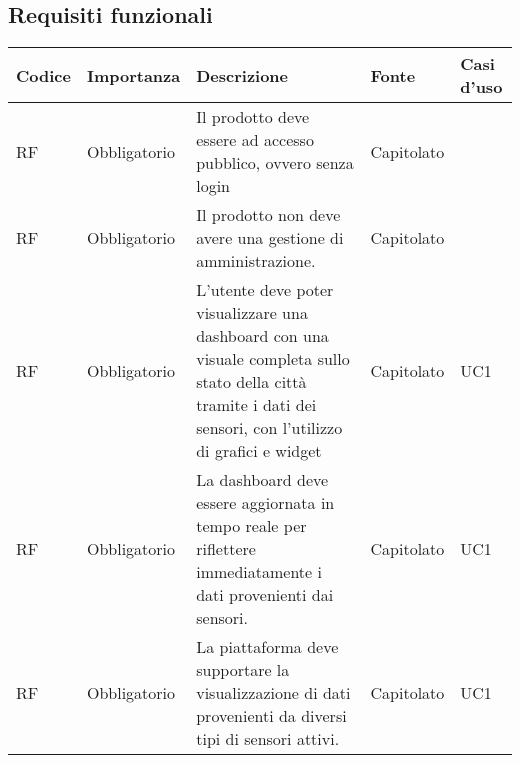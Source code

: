 \subsection{Requisiti funzionali}

\begin{longtable}{|C{1cm}|C{2cm}|>{\raggedright}m{5cm}|C{2cm}|C{1.5cm}|}
    \hline
    \textbf{Codice}                                & \textbf{Importanza} & \textbf{Descrizione}                                                                                                                                                                                                               & \textbf{Fonte}  & \textbf{Casi d'uso} \\
    \hline
    RF                          & Obbligatorio        & Il prodotto deve essere ad accesso pubblico, ovvero senza login                                                                                                                                                                    & Capitolato      &                     \\
    \hline
     RF & Obbligatorio        & Il prodotto non deve avere una gestione di amministrazione.                                                                                                                                                                        & Capitolato      &                     \\
    \hline
     RF & Obbligatorio        & L'utente deve poter visualizzare una dashboard con una visuale completa sullo stato della città tramite \newline i dati dei sensori, con l'utilizzo di grafici e widget                                                             & Capitolato      & UC1          \\
    \hline
     RF & Obbligatorio        & La dashboard deve essere aggiornata in tempo reale per riflettere immediatamente i dati provenienti dai sensori.                                                                                                                   & Capitolato      & UC1               \\
    \hline
     RF & Obbligatorio        & La piattaforma deve supportare la visualizzazione di dati provenienti da diversi tipi di sensori attivi.                                                                                                                           & Capitolato      & UC1               \\

\end{longtable}
